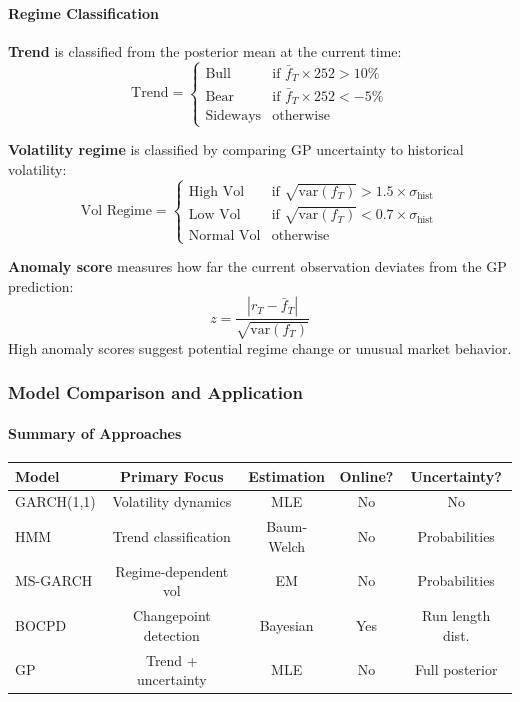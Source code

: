 \paragraph{Regime Classification}

\textbf{Trend} is classified from the posterior mean at the current time:
\begin{equation}
  \text{Trend} = \begin{cases}
    \text{Bull} & \text{if } \bar{f}_T \times 252 > 10\% \\
    \text{Bear} & \text{if } \bar{f}_T \times 252 < -5\% \\
    \text{Sideways} & \text{otherwise}
  \end{cases}
\end{equation}

\textbf{Volatility regime} is classified by comparing GP uncertainty to historical volatility:
\begin{equation}
  \text{Vol Regime} = \begin{cases}
    \text{High Vol} & \text{if } \sqrt{\text{var}(f_T)} > 1.5 \times \sigma_{\text{hist}} \\
    \text{Low Vol} & \text{if } \sqrt{\text{var}(f_T)} < 0.7 \times \sigma_{\text{hist}} \\
    \text{Normal Vol} & \text{otherwise}
  \end{cases}
\end{equation}

\textbf{Anomaly score} measures how far the current observation deviates from the GP prediction:
\begin{equation}
  z = \frac{|r_T - \bar{f}_T|}{\sqrt{\text{var}(f_T)}}
\end{equation}
High anomaly scores suggest potential regime change or unusual market behavior.

\subsubsection{Model Comparison and Application}

\paragraph{Summary of Approaches}

\begin{center}
\begin{tabular}{lcccc}
\hline
\textbf{Model} & \textbf{Primary Focus} & \textbf{Estimation} & \textbf{Online?} & \textbf{Uncertainty?} \\
\hline
GARCH(1,1) & Volatility dynamics & MLE & No & No \\
HMM & Trend classification & Baum-Welch & No & Probabilities \\
MS-GARCH & Regime-dependent vol & EM & No & Probabilities \\
BOCPD & Changepoint detection & Bayesian & Yes & Run length dist. \\
GP & Trend + uncertainty & MLE & No & Full posterior \\
\hline
\end{tabular}
\end{center}

